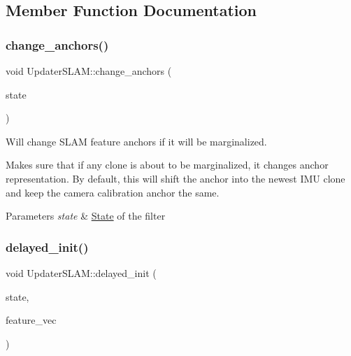 \subsection{Member Function Documentation}
\mbox{\label{classov__msckf_1_1UpdaterSLAM_ae85d162f1a93f1dbed1a60b2fdd26870}} 
\subsubsection{\texorpdfstring{change\+\_\+anchors()}{change\_anchors()}}
{\footnotesize\ttfamily void Updater\+S\+L\+A\+M\+::change\+\_\+anchors (\begin{DoxyParamCaption}\item[{std\+::shared\+\_\+ptr$<$ \hyperlink{classov__msckf_1_1State}{State} $>$}]{state }\end{DoxyParamCaption})}



Will change S\+L\+AM feature anchors if it will be marginalized. 

Makes sure that if any clone is about to be marginalized, it changes anchor representation. By default, this will shift the anchor into the newest I\+MU clone and keep the camera calibration anchor the same.


\begin{DoxyParams}{Parameters}
{\em state} & \hyperlink{classov__msckf_1_1State}{State} of the filter \\
\hline
\end{DoxyParams}
\mbox{\label{classov__msckf_1_1UpdaterSLAM_a4ef14978d06b4386672fe56c3a844fda}} 
\subsubsection{\texorpdfstring{delayed\+\_\+init()}{delayed\_init()}}
{\footnotesize\ttfamily void Updater\+S\+L\+A\+M\+::delayed\+\_\+init (\begin{DoxyParamCaption}\item[{std\+::shared\+\_\+ptr$<$ \hyperlink{classov__msckf_1_1State}{State} $>$}]{state,  }\item[{std\+::vector$<$ std\+::shared\+\_\+ptr$<$ \hyperlink{classov__core_1_1Feature}{ov\+\_\+core\+::\+Feature} $>$$>$ \&}]{feature\+\_\+vec }\end{DoxyParamCaption})}



